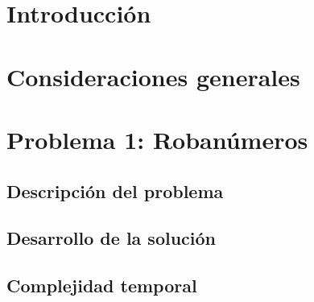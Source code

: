 \documentclass[a4paper, 10pt, twoside]{article}
\begin{document}
\newpage



\tableofcontents

\newpage



\section{Introducción}


\section{Consideraciones generales}


\newpage



\section{Problema 1: Robanúmeros}

\subsection{Descripción del problema}
\label{problema1-descripcion}


\subsection{Desarrollo de la solución}
\label{problema1-desarrollo}


\subsection{Complejidad temporal}
\label{problema1-complejidad}

\end{document}
